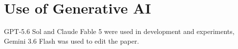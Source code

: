 \documentclass[sigconf,nonacm]{acmart}
\begin{document}



\appendix


\section*{Use of Generative AI}
GPT-5.6 Sol and Claude Fable 5 were used in development and experiments, Gemini 3.6 Flash was used to edit the paper.
\end{document}
